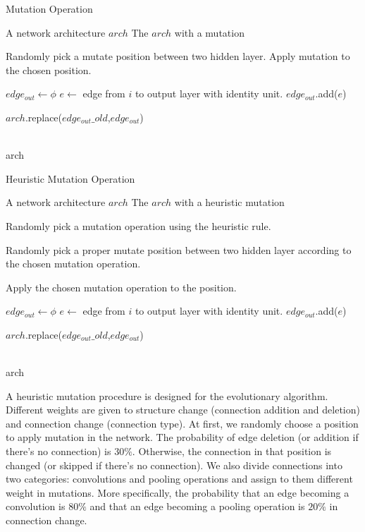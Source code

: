 \documentclass[conference]{IEEEtran}
\begin{document}
  

 \begin{algorithm}[H]  
    \caption{ Mutation Operation}
 

    \begin{algorithmic}[1]  
    \Require A network architecture $arch$
    \Ensure The $arch$ with a mutation
    
    
        \State Randomly pick a mutate position between two hidden layer.
        \State Apply mutation to the chosen position. 
    \EndWhile
    
    \State $edge_{out} \gets \phi$
      \State $e \gets$ edge from $i$ to output layer with identity unit.
      \State $edge_{out}$.add($e$)
    \EndFor

    \State $arch$.replace($edge_{out}\_old$,$edge_{out}$)

    \\
    \Return arch
    \end{algorithmic}  
    \label{mutation}
\end{algorithm}  

 \begin{algorithm}[H]  
	\caption{Heuristic Mutation Operation}
	
	
	\begin{algorithmic}[1]  
		\Require A network architecture $arch$
		\Ensure The $arch$ with a heuristic mutation
		
		\State Randomly pick a mutation operation using the heuristic rule.
		
		\State Randomly pick a proper mutate position between two hidden layer according to the chosen mutation operation.
		
		\State Apply the chosen mutation operation to the position.
		
		\State $edge_{out} \gets \phi$
		\State $e \gets$ edge from $i$ to output layer with identity unit.
		\State $edge_{out}$.add($e$)
		\EndFor
		
		\State $arch$.replace($edge_{out}\_old$,$edge_{out}$)
		
		\\
		\Return arch
	\end{algorithmic}  
	\label{mutation}
\end{algorithm}  

  A heuristic mutation procedure is designed for the evolutionary algorithm. Different weights are given to structure change (connection addition and deletion) and connection change (connection type). At first, we randomly choose a position to apply mutation in the network. The probability of edge deletion (or addition if there's no connection) is $30\%$. Otherwise, the connection in that position is changed (or skipped if there's no connection). We also divide connections into two categories: convolutions and pooling operations and assign to them different weight in mutations. More specifically, the probability that an edge becoming a convolution is $80\%$ and that an edge becoming a pooling operation is $20\%$ in connection change. 
\end{document}
